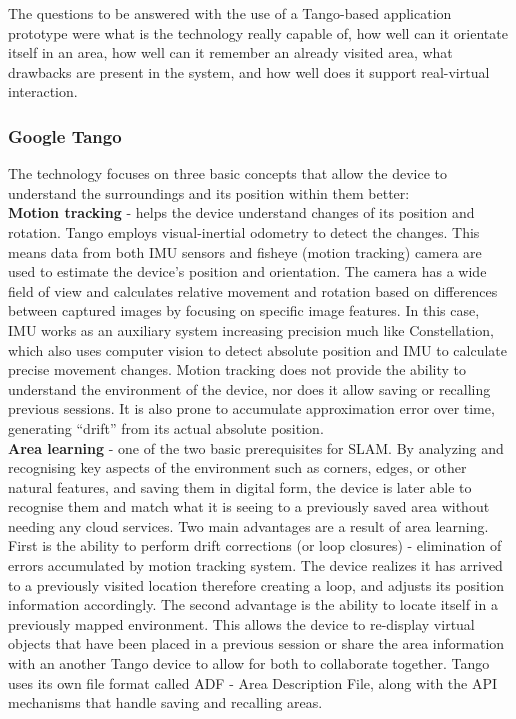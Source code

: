\documentclass[12pt, a4paper]{article}
\begin{document}
The questions to be answered with the use of a Tango-based application prototype were what is the technology really capable of, how well can it orientate itself in an area, how well can it remember an already visited area, what drawbacks are present in the system, and how well does it support real-virtual interaction.

\subsubsection{Google Tango}
The technology focuses on three basic concepts that allow the device to understand the surroundings and its position within them better:\\
\textbf{Motion tracking} - helps the device understand changes of its position and rotation. Tango employs visual-inertial odometry to detect the changes. This means data from both IMU sensors and fisheye (motion tracking) camera are used to estimate the device’s position and orientation. The camera has a wide field of view and calculates relative movement and rotation based on differences between captured images by focusing on specific image features. In this case, IMU works as an auxiliary system increasing precision much like Constellation, which also uses computer vision to detect absolute position and IMU to calculate precise movement changes. Motion tracking does not provide the ability to understand the environment of the device, nor does it allow saving or recalling previous sessions. It is also prone to accumulate approximation error over time, generating “drift” from its actual absolute position.\\
\textbf{Area learning} - one of the two basic prerequisites for SLAM. By analyzing and recognising key aspects of the environment such as corners, edges, or other natural features, and saving them in digital form, the device is later able to recognise them and match what it is seeing to a previously saved area without needing any cloud services. Two main advantages are a result of area learning. First is the ability to perform drift corrections (or loop closures) - elimination of errors accumulated by motion tracking system. The device realizes it has arrived to a previously visited location therefore creating a loop, and adjusts its position information accordingly. The second advantage is the ability to locate itself in a previously mapped environment. This allows the device to re-display virtual objects that have been placed in a previous session or share the area information with an another Tango device to allow for both to collaborate together. Tango uses its own file format called ADF - Area Description File, along with the API mechanisms that handle saving and recalling areas.\\
\end{document}
